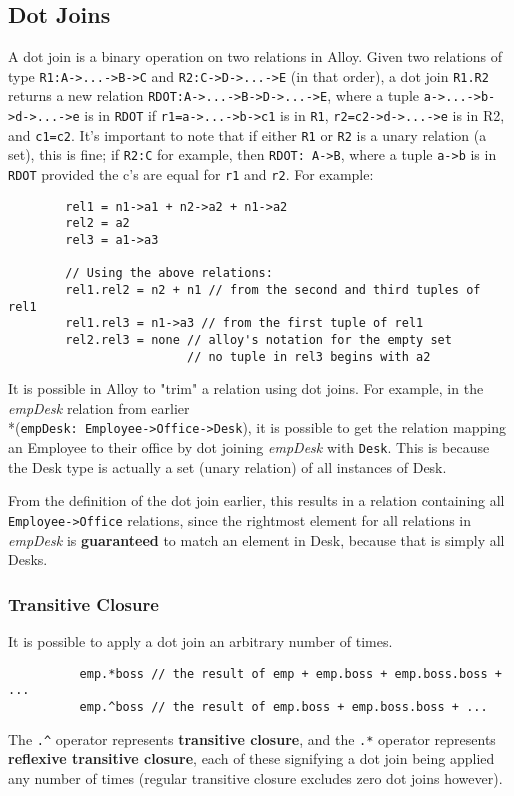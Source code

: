 \documentclass[10pt]{article}
\begin{document}
    \subsection*{Dot Joins}
      A dot join is a binary operation on two relations in Alloy. Given two relations of type \lstinline|R1:A->...->B->C| and \lstinline|R2:C->D->...->E| (in that order), a dot join \lstinline|R1.R2| returns a new relation \lstinline|RDOT:A->...->B->D->...->E|, where a tuple \lstinline|a->...->b->d->...->e| is in \lstinline|RDOT| if \lstinline|r1=a->...->b->c1| is in \lstinline|R1|, \lstinline|r2=c2->d->...->e| is in R2, and \lstinline|c1=c2|. It's important to note that if either \lstinline|R1| or \lstinline|R2| is a unary relation (a set), this is fine; if \lstinline|R2:C| for example, then \lstinline|RDOT: A->B|, where a tuple \lstinline|a->b| is in \lstinline|RDOT| provided the c's are equal for \lstinline|r1| and \lstinline|r2|. For example:
      \begin{lstlisting}
        rel1 = n1->a1 + n2->a2 + n1->a2
        rel2 = a2
        rel3 = a1->a3

        // Using the above relations:
        rel1.rel2 = n2 + n1 // from the second and third tuples of rel1
        rel1.rel3 = n1->a3 // from the first tuple of rel1
        rel2.rel3 = none // alloy's notation for the empty set
                         // no tuple in rel3 begins with a2
      \end{lstlisting} \par
      It is possible in Alloy to "trim" a relation using dot joins. For example, in the \textit{empDesk} relation from earlier\\*(\lstinline|empDesk: Employee->Office->Desk|), it is possible to get the relation mapping an Employee to their office by dot joining \textit{empDesk} with \lstinline|Desk|. This is because the Desk type is actually a set (unary relation) of all instances of Desk.\par
      From the definition of the dot join earlier, this results in a relation containing all \lstinline|Employee->Office| relations, since the rightmost element for all relations in \textit{empDesk} is \textbf{guaranteed} to match an element in Desk, because that is simply all Desks.
      \subsubsection*{Transitive Closure}
        It is possible to apply a dot join an arbitrary number of times.
        \begin{lstlisting}
          emp.*boss // the result of emp + emp.boss + emp.boss.boss + ...
          emp.^boss // the result of emp.boss + emp.boss.boss + ...
        \end{lstlisting}\par
        The \lstinline|.^| operator represents \textbf{transitive closure}, and the \lstinline|.*| operator represents \textbf{reflexive transitive closure}, each of these signifying a dot join being applied any number of times (regular transitive closure excludes zero dot joins however).
\end{document}

